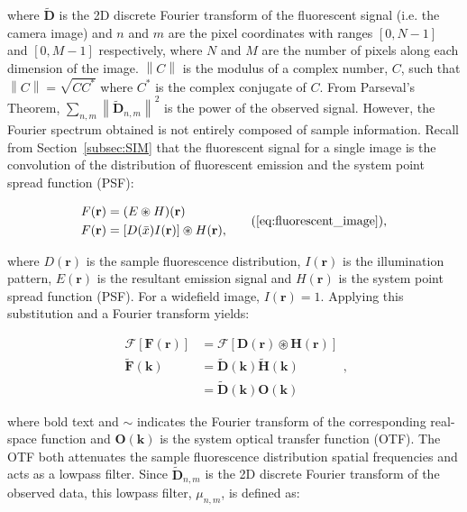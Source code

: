 where $\tilde{\textbf{D}}$ is the 2D discrete Fourier transform of 
the fluorescent signal (i.e. the camera image) and $n$ and 
$m$ are the pixel coordinates with ranges $[0, N-1]$ and $[0, M-1]$ 
respectively, where $N$ and $M$ are the number of pixels along each 
dimension of the image. $\left\| C \right\|$ is the modulus of a complex 
number, $C$, such that $\left\| C \right\| = \sqrt{CC^{*}}$ where $C^{*}$ is 
the complex conjugate of $C$. From Parseval's Theorem, $\sum\limits_{n,m}
\left\| \tilde{\textbf{D}}_{n,m} \right\|^2$ is the power of the 
observed signal. However, the Fourier spectrum obtained is not 
entirely composed of sample information. Recall from Section~\ref{subsec:SIM} 
that the fluorescent signal for a single image is the convolution of the 
distribution of fluorescent emission and the system point spread function 
(PSF):

\begin{equation}
\begin{split}
F(\textbf{r}) &= (E \circledast H)(\textbf{r})\\
F(\textbf{r}) &= [D(\bar{x})I(\textbf{r})] \circledast H(\textbf{r}),\\
\end{split}\tag{\ref{eq:fluorescent_image}},
\end{equation}

where $D(\textbf{r})$ is the sample fluorescence distribution, 
$I(\textbf{r})$ is the illumination pattern, $E(\textbf{r})$ is
the resultant emission signal and $H(\textbf{r})$ is the system 
point spread function (PSF). For a widefield image, 
$I(\textbf{r}) = 1$. Applying this substitution and a Fourier 
transform yields:

\begin{equation}\label{eq:fluor_signal_fourier}
\begin{split}
\mathcal{F}[\textbf{F}(\textbf{r})] &= \mathcal{F}[\textbf{D}(\textbf{r}) \circledast \textbf{H}(\textbf{r})]\\
\tilde{\textbf{F}}(\textbf{k}) &= \tilde{\textbf{D}}(\textbf{k}) \tilde{\textbf{H}}(\textbf{k})\\
&= \tilde{\textbf{D}}(\textbf{k}) \textbf{O}(\textbf{k})		
\end{split},
\end{equation}

where bold text and $\sim$ indicates the Fourier transform of the corresponding 
real-space function and $\textbf{O}(\textbf{k})$ is the system optical transfer 
function (OTF)\cite{gustafsson2008three}. The OTF both attenuates the sample 
fluorescence distribution spatial frequencies and acts as a lowpass filter. 
Since $\tilde{\textbf{D}}_{n,m}$ is the 2D discrete Fourier transform of 
the observed data, this lowpass filter, $\mu_{n,m}$, is defined as:

